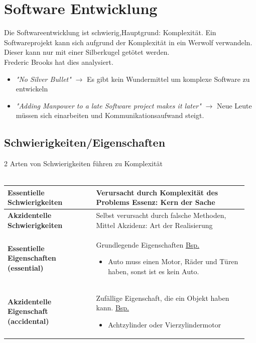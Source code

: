 \section{Software Entwicklung}
\begin{figure}
\end{figure}
Die Softwareentwicklung ist schwierig,Hauptgrund: Komplexität.  
Ein Softwareprojekt kann sich aufgrund der Komplexität in ein Werwolf verwandeln. Dieser kann nur mit einer Silberkugel getötet werden.\\
Frederic Brooks hat dies analysiert. \\

\begin{itemize}
	\item \textit{"No Silver Bullet"} $\rightarrow$ Es gibt kein Wundermittel um komplexe Software zu entwickeln
	\item \textit{"{}Adding Manpower to a late Software project makes it later"} $\rightarrow$ Neue Leute müssen sich einarbeiten und Kommunikationsaufwand steigt. 
\end{itemize}

\subsection{Schwierigkeiten/Eigenschaften}
2 Arten von Schwierigkeiten führen zu Komplexität\\ \\
\begin{tabular}{|p{0.35\linewidth}|p{0.6\linewidth}|}
	\hline
	\textbf{Essentielle Schwierigkeiten} & Verursacht durch Komplexität des Problems \newline Essenz: Kern der Sache \\ \hline
	\textbf{Akzidentelle Schwierigkeiten} & Selbst verursacht durch falsche Methoden, Mittel \newline Akzidenz: Art der Realisierung \\ \hline\hline
	\textbf{Essentielle Eigenschaften (essential)} & Grundlegende Eigenschaften \newline \underline{Bsp.} 
	\begin{itemize}
	\item Auto muss einen Motor, Räder und Türen haben, sonst ist es kein Auto.
	\end{itemize} \\ \hline
	\textbf{Akzidentelle Eigenschaft (accidental)} & Zufällige Eigenschaft, die ein Objekt haben kann. \newline \underline{Bsp.} 
	\begin{itemize}
	\item Achtzylinder oder Vierzylindermotor
	\end{itemize} \\ \hline
\end{tabular}

